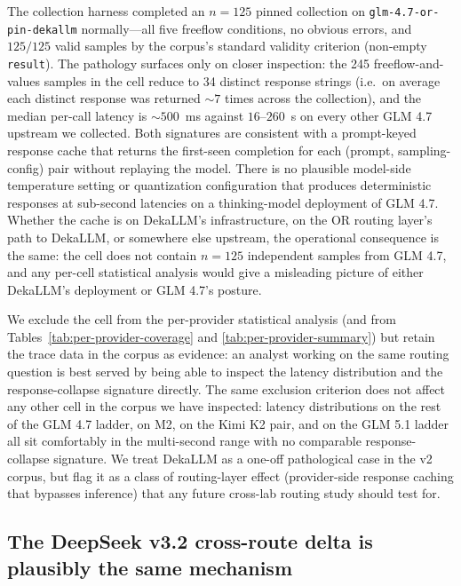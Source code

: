 \documentclass[11pt,a4paper]{article}
\begin{document}
The collection harness completed an $n{=}125$ pinned collection on \texttt{glm-4.7-or-pin-dekallm} normally---all five freeflow conditions, no obvious errors, and $125/125$ valid samples by the corpus's standard validity criterion (non-empty \texttt{result}). The pathology surfaces only on closer inspection: the 245 freeflow-and-values samples in the cell reduce to 34 distinct response strings (i.e.\ on average each distinct response was returned ${\sim}7$ times across the collection), and the median per-call latency is ${\sim}500$~ms against $16$--$260$~s on every other GLM 4.7 upstream we collected. Both signatures are consistent with a prompt-keyed response cache that returns the first-seen completion for each (prompt, sampling-config) pair without replaying the model. There is no plausible model-side temperature setting or quantization configuration that produces deterministic responses at sub-second latencies on a thinking-model deployment of GLM 4.7. Whether the cache is on DekaLLM's infrastructure, on the OR routing layer's path to DekaLLM, or somewhere else upstream, the operational consequence is the same: the cell does not contain $n{=}125$ independent samples from GLM 4.7, and any per-cell statistical analysis would give a misleading picture of either DekaLLM's deployment or GLM 4.7's posture.

We exclude the cell from the per-provider statistical analysis (and from Tables~\ref{tab:per-provider-coverage} and \ref{tab:per-provider-summary}) but retain the trace data in the corpus as evidence: an analyst working on the same routing question is best served by being able to inspect the latency distribution and the response-collapse signature directly. The same exclusion criterion does not affect any other cell in the corpus we have inspected: latency distributions on the rest of the GLM 4.7 ladder, on M2, on the Kimi K2 pair, and on the GLM 5.1 ladder all sit comfortably in the multi-second range with no comparable response-collapse signature. We treat DekaLLM as a one-off pathological case in the v2 corpus, but flag it as a class of routing-layer effect (provider-side response caching that bypasses inference) that any future cross-lab routing study should test for.

\subsection{The DeepSeek v3.2 cross-route delta is plausibly the same mechanism}
\label{sec:routing-deepseek}
\end{document}
